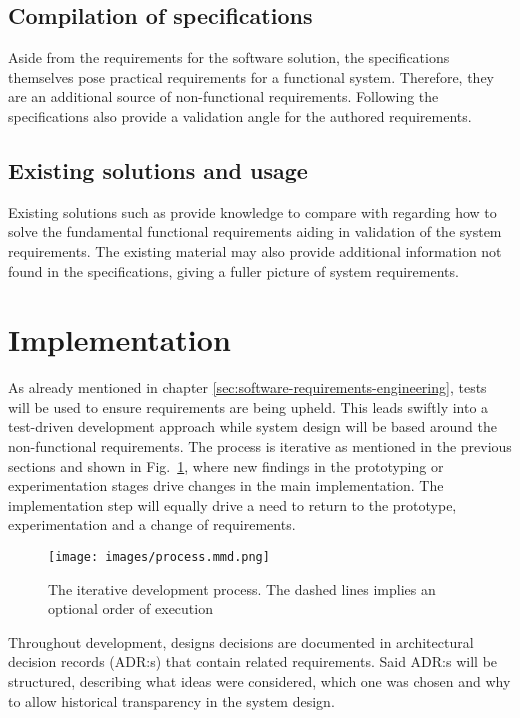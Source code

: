 \subsection{Compilation of specifications}

Aside from the requirements for the software solution, the
specifications \cite{etsi-ts-102-221, etsi-ts-131-102} 
themselves pose practical requirements for a functional system.
Therefore, they are an additional source of non-functional
requirements. Following the specifications also provide a
validation angle for the authored requirements.

\subsection{Existing solutions and usage}

Existing solutions such as \cite{osmocom-remsim} provide knowledge
to compare with regarding how to solve the fundamental functional
requirements aiding in validation of the system requirements. The
existing material may also provide additional information not found
in the specifications, giving a fuller picture of system
requirements.

\section{Implementation}
\label{sec:implementation}

As already mentioned in chapter \ref{sec:software-requirements-engineering},
tests will be used to ensure requirements are being upheld. This
leads swiftly into a test-driven development approach \cite[242-245]{sommerville-software-engineering}
while system design will be based around the non-functional
requirements. The process is iterative as mentioned in the previous
sections and shown in Fig.~\ref{fig:process-diagram}, where new
findings in the prototyping or experimentation stages drive changes
in the main implementation. The implementation step will equally
drive a need to return to the prototype, experimentation and a change
of requirements.

\begin{figure}[ht]
    \centering
	\texttt{[image: images/process.mmd.png]}
	\caption{The iterative development process. The dashed lines implies an optional order of execution}
	\label{fig:process-diagram}
\end{figure}

Throughout development, designs decisions are documented in
architectural decision records (ADR:s) \cite{adr, adr-github} that
contain related requirements. Said ADR:s will be structured,
describing what ideas were considered, which one was chosen and why
to allow historical transparency in the system design.
